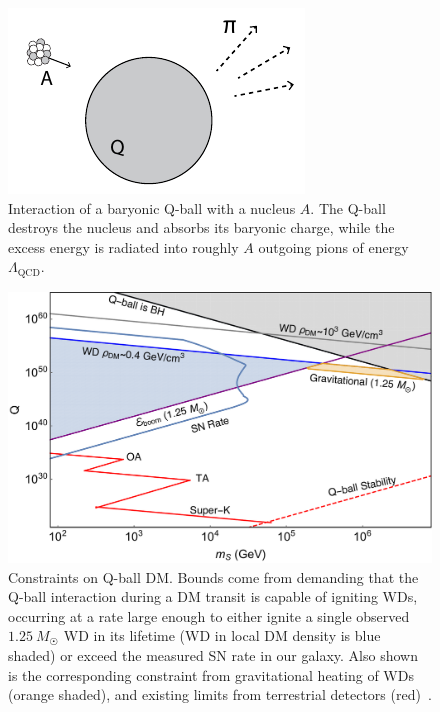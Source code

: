 \begin{figure}
\includegraphics[scale=1.0]{qball-cartoon.pdf}
\caption{Interaction of a baryonic Q-ball with a nucleus $A$. The Q-ball destroys the nucleus and absorbs its baryonic charge, while the excess energy is radiated into roughly $A$ outgoing pions of energy $\Lambda_\text{QCD}$.}
\label{fig:qball-cartoon}
\end{figure}

\begin{figure}
\includegraphics[scale=.35]{Qballconstraint.pdf}
\caption{
Constraints on Q-ball DM.
Bounds come from demanding that the Q-ball interaction during a DM transit is capable of igniting WDs, occurring at a rate large enough to either ignite a single observed $1.25~M_{\astrosun}$ WD in its lifetime (WD in local DM density is blue shaded) or exceed the measured SN rate in our galaxy.
Also shown is the corresponding constraint from gravitational heating of WDs (orange shaded), and existing limits from terrestrial detectors (red)~\cite{Dine:2003ax}.}
\label{fig:Qballconstraint}
\end{figure}
